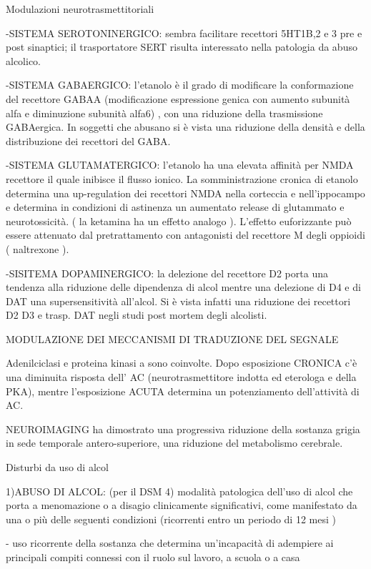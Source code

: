 \documentclass[]{article}
\begin{document}
Modulazioni neurotrasmettitoriali

-SISTEMA SEROTONINERGICO: sembra facilitare recettori 5HT1B,2 e 3 pre e
post sinaptici; il trasportatore SERT risulta interessato nella
patologia da abuso alcolico.

-SISTEMA GABAERGICO: l'etanolo è il grado di modificare la conformazione
del recettore GABAA (modificazione espressione genica con aumento
subunità alfa e diminuzione subunità alfa6) , con una riduzione della
trasmissione GABAergica. In soggetti che abusano si è vista una
riduzione della densità e della distribuzione dei recettori del GABA.

-SISTEMA GLUTAMATERGICO: l'etanolo ha una elevata affinità per NMDA
recettore il quale inibisce il flusso ionico. La somministrazione
cronica di etanolo determina una up-regulation dei recettori NMDA nella
corteccia e nell'ippocampo e determina in condizioni di astinenza un
aumentato release di glutammato e neurotossicità. ( la ketamina ha un
effetto analogo ). L'effetto euforizzante può essere attenuato dal
pretrattamento con antagonisti del recettore M degli oppioidi (
naltrexone ).

-SISITEMA DOPAMINERGICO: la delezione del recettore D2 porta una
tendenza alla riduzione delle dipendenza di alcol mentre una delezione
di D4 e di DAT una supersensitività all'alcol. Si è vista infatti una
riduzione dei recettori D2 D3 e trasp. DAT negli studi post mortem degli
alcolisti.

MODULAZIONE DEI MECCANISMI DI TRADUZIONE DEL SEGNALE

Adenilciclasi e proteina kinasi a sono coinvolte. Dopo esposizione
CRONICA c'è una diminuita risposta dell' AC (neurotrasmettitore indotta
ed eterologa e della PKA), mentre l'esposizione ACUTA determina un
potenziamento dell'attività di AC.

NEUROIMAGING ha dimostrato una progressiva riduzione della sostanza
grigia in sede temporale antero-superiore, una riduzione del metabolismo
cerebrale.

Disturbi da uso di alcol

1)ABUSO DI ALCOL: (per il DSM 4) modalità patologica dell'uso di alcol
che porta a menomazione o a disagio clinicamente significativi, come
manifestato da una o più delle seguenti condizioni (ricorrenti entro un
periodo di 12 mesi )

- uso ricorrente della sostanza che determina un'incapacità di adempiere
ai principali compiti connessi con il ruolo sul lavoro, a scuola o a
casa
\end{document}
